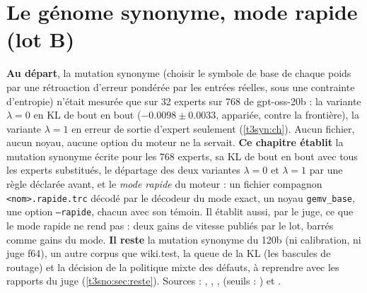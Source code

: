 
\chapter{Le génome synonyme, mode rapide (lot B)}\label{t3sno:ch}

\begin{origine}
\textbf{Au départ}, la mutation synonyme (choisir le symbole de base de chaque poids par une rétroaction d'erreur pondérée par les entrées réelles, sous une contrainte d'entropie) n'était mesurée que sur \num{32} experts sur \num{768} de gpt-oss-20b : la variante $\lambda = 0$ en KL de bout en bout ($-\num{0.0098} \pm \num{0.0033}$, appariée, contre la frontière), la variante $\lambda = 1$ en erreur de sortie d'expert seulement (\cref{t3syn:ch}). Aucun fichier, aucun noyau, aucune option du moteur ne la servait.
\textbf{Ce chapitre établit} la mutation synonyme écrite pour les \num{768} experts, sa KL de bout en bout avec tous les experts substitués, le départage des deux variantes $\lambda = 0$ et $\lambda = 1$ par une règle déclarée avant, et le \emph{mode rapide} du moteur : un fichier compagnon \texttt{<nom>.rapide.trc} décodé par le décodeur du mode exact, un noyau \texttt{gemv\_base}, une option \texttt{--rapide}, chacun avec son témoin. Il établit aussi, par le juge, ce que le mode rapide ne rend pas : deux gains de vitesse publiés par le lot, barrés comme gains du mode.
\textbf{Il reste} la mutation synonyme du 120b (ni calibration, ni juge f64), un autre corpus que wiki.test, la queue de la KL (les bascules de routage) et la décision de la politique mixte des défauts, à reprendre avec les rapports du juge (\cref{t3sno:sec:reste}).
Sources : , , ,  (seuils : ) et .
\end{origine}

